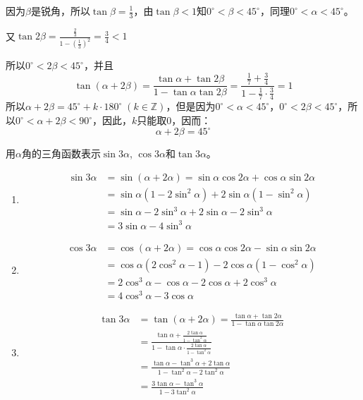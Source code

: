 \begin{solution}
因为$\beta$是锐角，所以$\tan\beta=\frac{1}{3}$，由$\tan\beta<1$知$0^{\circ}<\beta<45^{\circ}$，同理$0^{\circ}<\alpha<45^{\circ}$。

又$\tan2\beta=\frac{\frac{2}{3}}{1-\left(\frac{1}{3}\right)^2}=\frac{3}{4}<1$

所以$0^{\circ}<2\beta <45^{\circ}$，并且
\[\tan(\alpha+2\beta)=\frac{\tan \alpha+\tan2\beta}{1-\tan \alpha\tan2\beta}=\frac{\frac{1}{7}+\frac{3}{4}}{1-\frac{1}{7}\cdot \frac{3}{4}}=1\]
所以$\alpha+2\beta=45^{\circ}+k\cdot 180^{\circ}\; (k\in\mathbb{Z})$，但是因为$0^{\circ}<\alpha<45^{\circ}$，$0^{\circ}<2\beta <45^{\circ}$，所以$0^{\circ}<\alpha+2\beta<90^{\circ}$，因此，$k$只能取0，因而：
\[\alpha+2\beta=45^{\circ}\]
\end{solution}


\begin{example}
用$\alpha$角的三角函数表示$\sin3\alpha$, $\cos3\alpha$和$\tan3\alpha$。
\end{example}



\begin{solution}
\begin{enumerate}
    \item \[\begin{split}
        \sin3\alpha&=\sin(\alpha+2\alpha)=\sin\alpha \cos2\alpha+\cos\alpha\sin2\alpha\\
        &=\sin\alpha(1-2\sin^2\alpha)+2\sin\alpha(1-\sin^2\alpha) \\
        &=\sin\alpha-2\sin^3\alpha+2\sin\alpha-2\sin^3\alpha\\
        &=3\sin\alpha-4\sin^3\alpha     
    \end{split}\]
    \item \[\begin{split}
       \cos3\alpha&=\cos(\alpha+2\alpha)=\cos\alpha\cos2\alpha-\sin\alpha\sin2\alpha\\
       &=\cos\alpha(2\cos^2\alpha-1)-2\cos\alpha(1-\cos^2\alpha)\\
       &=2\cos^3\alpha-\cos\alpha-2\cos\alpha+2\cos^3\alpha\\
       &=4\cos^3\alpha-3\cos\alpha 
    \end{split}\]
    \item \[\begin{split}
\tan3\alpha&=\tan(\alpha+2\alpha)=\frac{\tan\alpha+\tan2\alpha}{1-\tan\alpha\tan2\alpha}\\
&=\frac{\tan\alpha+\frac{2\tan\alpha}{1-\tan^2\alpha}}{1-\tan\alpha\cdot \frac{2\tan\alpha}{1-\tan^2\alpha}}\\
&=\frac{\tan\alpha-\tan^3\alpha+2\tan\alpha}{1-\tan^2\alpha-2\tan^2\alpha}\\
&=\frac{3\tan\alpha-\tan^3\alpha}{1-3\tan^2\alpha}        
    \end{split}\]
\end{enumerate}
\end{solution}

